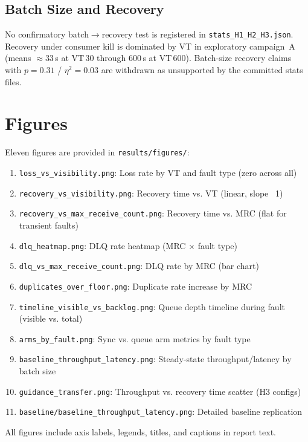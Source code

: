 \subsection{Batch Size and Recovery}

No confirmatory batch$\rightarrow$recovery test is registered in \texttt{stats\_H1\_H2\_H3.json}. Recovery under consumer kill is dominated by VT in exploratory campaign~A (means $\approx33$\,s at VT\,30 through $600$\,s at VT\,600). Batch-size recovery claims with $p=0.31$ / $\eta^2=0.03$ are withdrawn as unsupported by the committed stats files.

\section{Figures}

Eleven figures are provided in \texttt{results/figures/}:

\begin{enumerate}
    \item \texttt{loss\_vs\_visibility.png}: Loss rate by VT and fault type (zero across all)
    \item \texttt{recovery\_vs\_visibility.png}: Recovery time vs. VT (linear, slope ~1)
    \item \texttt{recovery\_vs\_max\_receive\_count.png}: Recovery time vs. MRC (flat for transient faults)
    \item \texttt{dlq\_heatmap.png}: DLQ rate heatmap (MRC × fault type)
    \item \texttt{dlq\_vs\_max\_receive\_count.png}: DLQ rate by MRC (bar chart)
    \item \texttt{duplicates\_over\_floor.png}: Duplicate rate increase by MRC
    \item \texttt{timeline\_visible\_vs\_backlog.png}: Queue depth timeline during fault (visible vs. total)
    \item \texttt{arms\_by\_fault.png}: Sync vs. queue arm metrics by fault type
    \item \texttt{baseline\_throughput\_latency.png}: Steady-state throughput/latency by batch size
    \item \texttt{guidance\_transfer.png}: Throughput vs. recovery time scatter (H3 configs)
    \item \texttt{baseline/baseline\_throughput\_latency.png}: Detailed baseline replication
\end{enumerate}

All figures include axis labels, legends, titles, and captions in report text.

